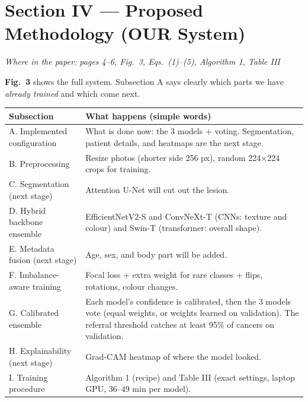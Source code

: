\documentclass[11pt,a4paper]{article}
\newcommand{\where}[1]{{\small\color{hcGray}\textit{Where in the paper: #1}}\par\smallskip}
\begin{document}
\section{Section IV --- Proposed Methodology (OUR System)}
\where{pages 4--6, Fig.~3, Eqs.~(1)--(5), Algorithm 1, Table III}
\textbf{Fig.~3} shows the full system. Subsection A says clearly which
parts we have \emph{already trained} and which come next.
\par\smallskip
\begin{tabularx}{\linewidth}{@{}L{3.8cm} Y@{}}
\toprule
\textbf{Subsection} & \textbf{What happens (simple words)} \\
\midrule
A. Implemented configuration & What is done now: the 3 models + voting. Segmentation, patient details, and heatmaps are the next stage. \\
B. Preprocessing & Resize photos (shorter side 256 px), random 224$\times$224 crops for training. \\
C. Segmentation (next stage) & Attention U-Net will cut out the lesion. \\
D. Hybrid backbone ensemble & EfficientNetV2-S and ConvNeXt-T (CNNs: texture and colour) and Swin-T (transformer: overall shape). \\
E. Metadata fusion (next stage) & Age, sex, and body part will be added. \\
F. Imbalance-aware training & Focal loss + extra weight for rare classes + flips, rotations, colour changes. \\
G. Calibrated ensemble & Each model's confidence is calibrated, then the 3 models vote (equal weights, or weights learned on validation). The referral threshold catches at least 95\% of cancers on validation. \\
H. Explainability (next stage) & Grad-CAM heatmap of where the model looked. \\
I. Training procedure & Algorithm 1 (recipe) and Table III (exact settings, laptop GPU, 36--49 min per model). \\
\bottomrule
\end{tabularx}
\end{document}
